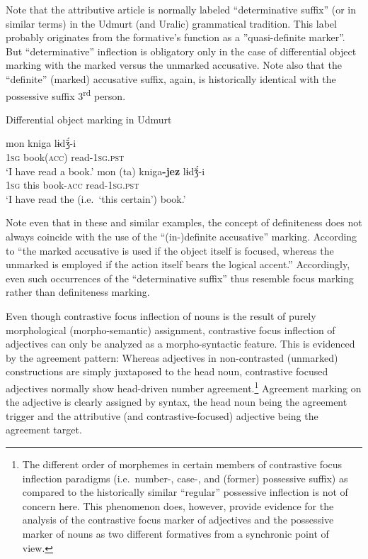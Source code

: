 Note that the attributive article is normally labeled “determinative suffix” (or in similar terms) in the Udmurt (and Uralic) grammatical tradition. This label probably originates from the formative's function as a ”quasi-definite marker”. But “determinative” inflection is obligatory only in the case of differential object marking with the marked versus the unmarked accusative. Note also that the “definite” (marked) accusative suffix, again, is historically identical with the possessive suffix 3\textsuperscript{rd} person.%
\begin{exe}
\ex \rm{Differential object marking in Udmurt \citep[22]{winkler2001}}
\begin{xlist}
\ex
\gll	mon kniga lɨdǯ́-i\\
	\textsc{1sg} book(\textsc{acc}) read-\textsc{1sg.pst}\\
\glt	‘I have read a book.’
\ex	
\gll	mon (ta) kniga\textbf{-jez} lɨdǯ́-i\\
	\textsc{1sg} this book-\textsc{acc} read-\textsc{1sg.pst}\\
\glt	‘I have read the (i.e.~‘this certain’) book.’
\end{xlist}
\end{exe}
Note even that in these and similar examples, the concept of definiteness does not always coincide with the use of the “(in-)definite accusative” marking. According to \citet[21]{winkler2001} “the marked accusative is used if the object itself is focused, whereas the unmarked is employed if the action itself bears the logical accent.” Accordingly, even such occurrences of the “determinative suffix” thus resemble focus marking rather than definiteness marking.

Even though contrastive focus inflection of nouns is the result of purely morphological (morpho-semantic) assignment, contrastive focus inflection of adjectives can only be analyzed as a morpho-syntactic feature. This is evidenced by the agreement pattern: Whereas adjectives in non-contrasted (unmarked) constructions are simply juxtaposed to the head noun, contrastive focused adjectives normally show head-driven number agreement.\footnote{The different order of morphemes in certain members of contrastive focus inflection paradigms (i.e.~number-, case-, and (former) possessive suffix) as compared to the historically similar “regular” possessive inflection \citep[32]{winkler2001} is not of concern here. This phenomenon does, however, provide evidence for the analysis of the contrastive focus marker of adjectives and the possessive marker of nouns as two different formatives from a synchronic point of view.} Agreement marking on the adjective is clearly assigned by syntax, the head noun being the agreement trigger and the attributive (and contrastive-focused) adjective being the agreement target.

